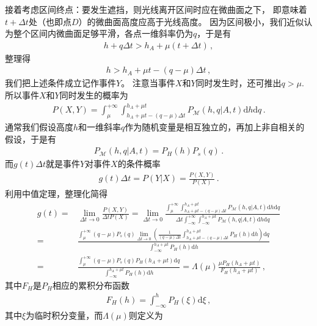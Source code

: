 接着考虑区间终点：要发生遮挡，则光线离开区间时应在微曲面之下，
即意味着$t+\Delta t$处（也即点$D$）的微曲面高度应高于光线高度。
因为区间极小，我们近似认为整个区间内微曲面足够平滑，各点一维斜率仍为$q$，于是有
\begin{align}
    h+q\Delta t>h_A+\mu(t+\Delta t)\, ,
\end{align}
整理得
\begin{align}
    h>h_A+\mu t-(q-\mu)\Delta t\, ,
\end{align}
我们把上述条件成立记作事件$Y$。
注意当事件$X$和$Y$同时发生时，还可推出$q>\mu$.
所以事件$X$和$Y$同时发生的概率为
\begin{align}
    P(X,Y)=\int_{\mu}^{+\infty}\int_{h_A+\mu t-(q-\mu)\Delta t}^{h_A+\mu t}
    P_{\mathcal{M}}(h,q|A,t)\mathrm{d}h\mathrm{d}q\, .
\end{align}
通常我们假设高度$h$和一维斜率$q$作为随机变量是相互独立的，再加上非自相关的假设，于是有
\begin{align}
    P_{\mathcal{M}}(h,q|A,t)=P_H(h)P_s(q)\, .
\end{align}
而$g(t)\Delta t$就是事件$Y$对事件$X$的条件概率
\begin{align}
    g(t)\Delta t=P(Y|X)=\frac{P(X,Y)}{P(X)}\, .
\end{align}
利用中值定理，整理化简得
\begin{align}\label{eq:08ex01-gt-expression}
    g(t)=&\lim\limits_{\Delta t\to 0}\frac{P(X,Y)}{\Delta tP(X)}
    =\lim\limits_{\Delta t\to 0}\frac{\displaystyle\int_{\mu}^{+\infty}\int_{h_A+\mu t-(q-\mu)\Delta t}^{h_A+\mu t}
    P_{\mathcal{M}}(h,q|A,t)\mathrm{d}h\mathrm{d}q}{\Delta t\displaystyle\int_{-\infty}^{+\infty}
    \int_{-\infty}^{h_A+\mu t}P_{\mathcal{M}}(h,q|A,t)\mathrm{d}h\mathrm{d}q}\nonumber\\
    =&\frac{\displaystyle\int_{\mu}^{+\infty}(q-\mu)P_s(q)\lim\limits_{\Delta t\to 0}
    \left(\frac{1}{(q-\mu)\Delta t}\int_{h_A+\mu t-(q-\mu)\Delta t}^{h_A+\mu t}P_H(h)\mathrm{d}h\right)\mathrm{d}q}
    {\displaystyle\int_{-\infty}^{h_A+\mu t}P_H(h)\mathrm{d}h}\nonumber\\
    =&\frac{\displaystyle\int_{\mu}^{+\infty}(q-\mu)P_s(q)P_H(h_A+\mu t)\mathrm{d}q}
    {\displaystyle\int_{-\infty}^{h_A+\mu t}P_H(h)\mathrm{d}h}
    =\Lambda(\mu)\frac{\mu P_H(h_A+\mu t)}{F_H(h_A+\mu t)}\, ,
\end{align}
其中$F_H$是$P_H$相应的累积分布函数
\begin{align}
    F_H(h)=\int_{-\infty}^{h}P_H(\xi)\mathrm{d}\xi\, ,
\end{align}
其中$\xi$为临时积分变量，而$\Lambda(\mu)$则定义为

